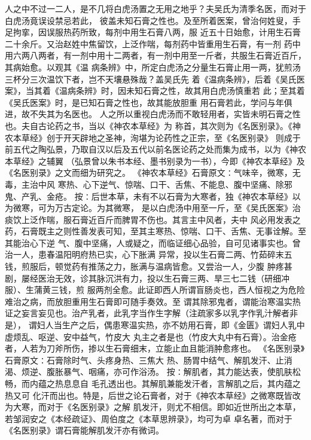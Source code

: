 \documentclass[a4paper,12pt,UTF8,twoside]{ctexbook}
\begin{document}
人之中不过一二人，是不几将白虎汤置之无用之地乎？夫吴氏为清季名医，而对于白虎汤竟误设禁忌若此， 
彼盖未知石膏之性也。及至所着医案，曾治何姓叟，手足拘挛，因误服热药所致，每剂中用生石膏八两，服 
近五十日始愈，计用生石膏二十余斤。又治赵姓中焦留饮，上泛作喘，每剂药中皆重用生石膏，有一剂 
药中用六两八两者，有一剂中用十二两者，有一剂中用至一斤者，共服生石膏近百斤，其病始愈。以观其《温 
病条辨》中，所定白虎汤之分量生石膏止用一两，犹煎汤三杯分三次温饮下者，岂不天壤悬殊哉？盖吴氏先 
着《温病条辨》，后着《吴氏医案》，当其着《温病条辨》时，因未知石膏之性，故其用白虎汤慎重若 
此；至其着《吴氏医案》时，是已知石膏之性也，故其能放胆重 
用石膏若此，学问与年俱进，故不失其为名医也。 
人之所以重视白虎汤而不敢轻用者，实皆未明石膏之性也。夫自古论药之书，当以《神农本草经》为 
称首，其次则为《名医别录》。《神农本草经》创于开天辟地之圣神，洵堪为论药性之正宗，至《名医别录》 
则成于前五代之陶弘景，乃取自汉以后及五代以前名医论药之处而集为成书，以为《神农本草经》之辅翼 
（弘景曾以朱书本经、墨书别录为一书），今即《神农本草经》及《名医别录》之文而细为研究之。 
《神农本草经》石膏原文∶气味辛，微寒，无毒，主治中风 
寒热、心下逆气、惊喘、口干、舌焦、不能息、腹中坚痛、除邪鬼、产乳、金疮。 
按∶后世本草，未有不以石膏为大寒者，独《神农本草经》以为微寒，可为万古定论。为其微寒， 
是以白虎汤中用至一斤，至《吴氏医案》治痰饮上泛作喘，服石膏近百斤而脾胃不伤也。其言主中风者，夫中 
风必用发表之药，石膏既主之则性善发表可知，至其主寒热、惊喘、口干、舌焦、无事诠解。至其能治心下逆 
气、腹中坚痛，人或疑之，而临证细心品验，自可见诸事实也。曾治一人，患春温阳明府热已实，心下胀满 
异常，投以生石膏二两、竹茹碎末五钱，煎服后，顿觉药有推荡之力，胀满与温病皆愈。又尝治一人，少腹 
肿疼甚剧，屡经医治无效，诊其脉沉洪有力，投以生石膏三两、旱三七二钱（研细冲服）、生蒲黄三钱，煎 
服两剂全愈。此证即西人所谓盲肠炎也，西人恒视之为危险难治之病，而放胆重用生石膏即可随手奏效。至 
谓其除邪鬼者，谓能治寒温实热证之妄言妄见也。治产乳者，此乳字当作生字解（注疏家多以乳字作乳汁解者非是）， 
谓妇人当生产之后，偶患寒温实热，亦不妨用石膏，即《金匮》谓妇人乳中虚烦乱、呕逆、安中益气，竹皮大 
丸主之者是也（竹皮大丸中有石膏）。治金疮者，人若为刀斧所伤，掺以生石膏细末，立能止血且能消肿愈疼也。 
《名医别录》石膏原文∶石膏除时气、头疼身热、三焦大 
热、肠胃中结气、解肌发汗、止消渴、烦逆、腹胀暴气、咽痛，亦可作浴汤。 
按∶解肌者，其力能达表，使肌肤松畅，而内蕴之热息息自 
毛孔透出也。其解肌兼能发汗者，言解肌之后，其内蕴之热又可 
化汗而出也。特是，后世之论石膏者，对于《神农本草经》之微寒既皆改为大寒，而对于《名医别录》之解 
肌发汗，则尤不相信。即如近世所出之本草，若邹润安之《本经疏证》、周伯度之《本草思辨录》，均可为卓 
卓名著，而对于《名医别录》谓石膏能解肌发汗亦有微词。 
\end{document}
